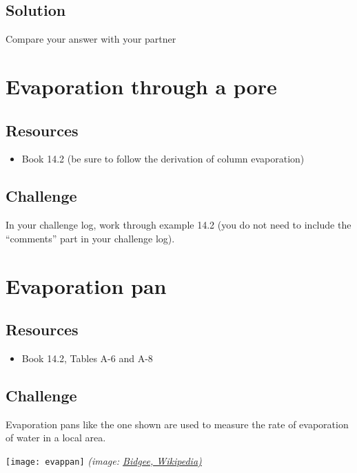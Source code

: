 \subsection*{Solution}
Compare your answer with your partner




\newpage
\section{Evaporation through a pore}

\subsection*{Resources}
\begin{itemize}
    \item Book 14.2 (be sure to follow the derivation of column evaporation)
\end{itemize}

\subsection*{Challenge}
In your challenge log, work through example 14.2 (you do not need to include the ``comments'' part in your challenge log).





\newpage
\section{Evaporation pan}

\subsection*{Resources}
\begin{itemize}
    \item Book 14.2, Tables A-6 and A-8
\end{itemize}

\subsection*{Challenge}
Evaporation pans like the one shown are used to measure the rate of evaporation of water in a local area.

\texttt{[image: evappan]}
\emph{(image: \href{https://commons.wikimedia.org/wiki/File:Evaporation_Pan.jpg}{Bidgee, Wikipedia)}}

